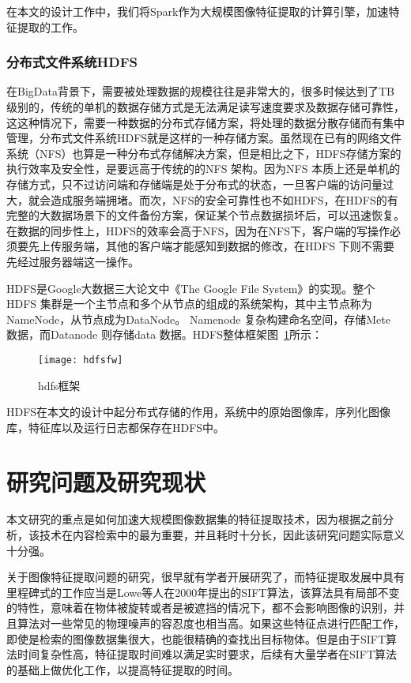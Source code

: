 在本文的设计工作中，我们将Spark作为大规模图像特征提取的计算引擎，加速特征提取的工作。
\subsubsection{分布式文件系统HDFS}
在BigData背景下，需要被处理数据的规模往往是非常大的，很多时候达到了TB级别的，传统的单机的数据存储方式是无法满足读写速度要求及数据存储可靠性，这这种情况下，需要一种数据的分布式存储方案，将处理的数据分散存储而有集中管理，分布式文件系统HDFS就是这样的一种存储方案。虽然现在已有的网络文件系统（NFS）也算是一种分布式存储解决方案，但是相比之下，HDFS存储方案的执行效率及安全性，是要远高于传统的的NFS 架构。因为NFS 本质上还是单机的存储方式，只不过访问端和存储端是处于分布式的状态，一旦客户端的访问量过大，就会造成服务端拥堵。而次，NFS的安全可靠性也不如HDFS，在HDFS的有完整的大数据场景下的文件备份方案，保证某个节点数据损坏后，可以迅速恢复。在数据的同步性上，HDFS的效率会高于NFS，因为在NFS下，客户端的写操作必须要先上传服务端，其他的客户端才能感知到数据的修改，在HDFS 下则不需要先经过服务器端这一操作。

HDFS是Google大数据三大论文中《The Google File System》的实现。整个HDFS 集群是一个主节点和多个从节点的组成的系统架构，其中主节点称为NameNode，从节点成为DataNode。 Namenode 复杂构建命名空间，存储Mete 数据，而Datanode 则存储data 数据。HDFS整体框架图~\ref{fig:hdfsfw}所示：
\begin{figure}[htp]
\centering
\texttt{[image: hdfsfw]}
\caption{hdfs框架}
\label{fig:hdfsfw}
\end{figure}

HDFS在本文的设计中起分布式存储的作用，系统中的原始图像库，序列化图像库，特征库以及运行日志都保存在HDFS中。

\section{研究问题及研究现状}
本文研究的重点是如何加速大规模图像数据集的特征提取技术，因为根据之前分析，该技术在内容检索中的最为重要，并且耗时十分长，因此该研究问题实际意义十分强。

关于图像特征提取问题的研究，很早就有学者开展研究了，而特征提取发展中具有里程碑式的工作应当是Lowe等人在2000年提出的SIFT算法，该算法具有局部不变的特性，意味着在物体被旋转或者是被遮挡的情况下，都不会影响图像的识别，并且算法对一些常见的物理噪声的容忍度也相当高。如果这些特征点进行匹配工作，即使是检索的图像数据集很大，也能很精确的查找出目标物体。但是由于SIFT算法时间复杂性高，特征提取时间难以满足实时要求，后续有大量学者在SIFT算法的基础上做优化工作，以提高特征提取的时间。

